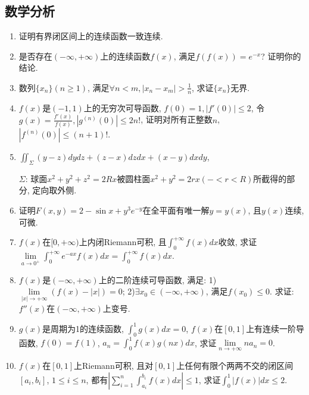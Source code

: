 \documentclass[12pt,a4paper,openany]{book}
\begin{document}
\subsection{数学分析}
\begin{enumerate}
\item 证明有界闭区间上的连续函数一致连续.

\item 是否存在$(-\infty, +\infty)$上的连续函数$f(x)$, 满足$f(f(x)) = e^{-x}$? 证明你的结论.

\item 数列$\{x_n\}(n \ge 1)$, 满足$\forall n < m, |x_n - x_m| > \displaystyle\frac{1}{n}$, 求证$\{x_n\}$无界.

\item $f(x)$是$(-1, 1)$上的无穷次可导函数, $f(0) = 1, |f'(0)| \le 2$, 令$g(x) = \displaystyle\frac{f'(x)}{f(x)}, |g^{(n)}(0)| \le 2n!$, 证明对所有正整数$n$, $|f^{(n)}(0)| \le (n+1)!$.

\item $\displaystyle\iint_{\Sigma}{(y - z)dydz + (z - x)dzdx + (x - y)dxdy}$,

$\Sigma$: 球面$x^2 + y^2 + z^2 = 2Rx$被圆柱面$x^2 + y^2 = 2rx(- < r< R)$所截得的部分, 定向取外侧.

\item 证明$F(x, y) = 2 - \sin{x} + y^3e^{-y}$在全平面有唯一解$y = y(x)$, 且$y(x)$连续, 可微.

\item $f(x)$在$[0, +\infty)$上内闭Riemann可积, 且$\displaystyle\int_{0}^{+\infty}{f(x)dx}$收敛, 求证$\displaystyle\lim\limits_{a \rightarrow 0^+}{\int_{0}^{+\infty}{e^{-ax}f(x)dx}} = \int_{0}^{+\infty}{f(x)dx}$.

\item $f(x)$是$(-\infty, +\infty)$上的二阶连续可导函数, 满足: 1)$\lim\limits_{|x| \rightarrow +\infty}{(f(x) - |x|)} = 0$; 2)$\exists x_0 \in (-\infty, +\infty)$, 满足$f(x_0) \le 0$. 求证: $f''(x)$在$(-\infty, +\infty)$上变号.

\item $g(x)$是周期为1的连续函数, $\displaystyle\int_{0}^{1}{g(x)dx} = 0$, $f(x)$在$[0, 1]$上有连续一阶导函数, $f(0) = f(1)$, $a_n = \displaystyle\int_{0}^{1}{f(x)g(nx)dx}$, 求证$\lim\limits_{n \rightarrow +\infty}{na_n} = 0$.

\item $f(x)$在$[0, 1]$上Riemann可积, 且对$[0, 1]$上任何有限个两两不交的闭区间$[a_i, b_i]$, $1 \le i \le n$, 都有$\displaystyle|\sum\limits_{i=1}^{n}{\int_{a_i}^{b_i}{f(x)dx}}| \le 1$, 求证$\displaystyle\int_{0}^{1}{|f(x)|dx} \le 2$.
\end{enumerate}
\end{document}
